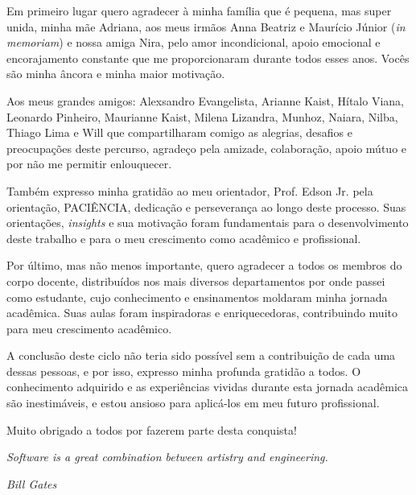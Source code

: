 \documentclass[
	12pt,			%
	openright,		%
	oneside,	
	a4paper,		%
	english,		%
	brazil			%
]{abntex2/abntex2}  %
\begin{document}
	\begin{agradecimentos}

		Em primeiro lugar quero agradecer à minha família que é pequena, mas super unida, minha mãe Adriana, aos meus irmãos Anna Beatriz e Maurício Júnior (\textit{in memoriam}) e nossa amiga Nira, pelo amor incondicional, apoio emocional e encorajamento constante que me proporcionaram durante todos esses anos. Vocês são minha âncora e minha maior motivação.
		
		Aos meus grandes amigos: Alexsandro Evangelista, Arianne Kaist, Hítalo Viana, Leonardo Pinheiro, Maurianne Kaist, Milena Lizandra, Munhoz, Naiara, Nilba, Thiago Lima e Will que compartilharam comigo as alegrias, desafios e preocupações deste percurso, agradeço pela amizade, colaboração, apoio mútuo e por não me permitir enlouquecer.
		
		Também expresso minha gratidão ao meu orientador, Prof. Edson Jr. pela orientação, PACIÊNCIA, dedicação e perseverança ao longo deste processo. Suas orientações, \textit{insights} e sua motivação foram fundamentais para o desenvolvimento deste trabalho e para o meu crescimento como acadêmico e profissional.
		
		Por último, mas não menos importante, quero agradecer a todos os membros do corpo docente, distribuídos nos mais diversos departamentos por onde passei como estudante, cujo conhecimento e ensinamentos moldaram minha jornada acadêmica. Suas aulas foram inspiradoras e enriquecedoras, contribuindo muito para meu crescimento acadêmico.
		
		A conclusão deste ciclo não teria sido possível sem a contribuição de cada uma dessas pessoas, e por isso, expresso minha profunda gratidão a todos. O conhecimento adquirido e as experiências vividas durante esta jornada acadêmica são inestimáveis, e estou ansioso para aplicá-los em meu futuro profissional.
		
		Muito obrigado a todos por fazerem parte desta conquista!

	\end{agradecimentos}

	\begin{epigrafe}
		
		\vspace*{\fill}
		\begin{flushright}
			
			\textit{Software is a great combination between artistry and engineering.}

			\textit{Bill Gates}
			
		\end{flushright}\vspace{4cm}
		
	\end{epigrafe}
\end{document}
